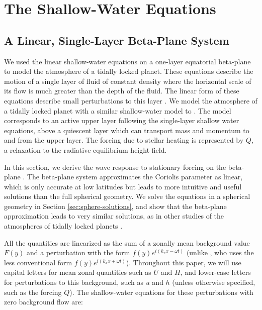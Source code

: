 \section{The Shallow-Water Equations}

\subsection*{A Linear, Single-Layer Beta-Plane System}

We used the linear shallow-water equations on a one-layer equatorial beta-plane to model the atmosphere of a tidally locked planet. These equations describe the motion of a single layer of fluid of constant density where the horizontal scale of its flow is much greater than the depth of the fluid. The linear form of these equations describe small perturbations to this layer \citep{vallis2006book}. We model the atmosphere of a tidally locked planet with a similar shallow-water model to \citet{showman2011superrotation}. The model corresponds to an active upper layer following the single-layer shallow water equations, above a quiescent layer which can transport mass and momentum to and from the upper layer. The forcing due to stellar heating is represented by $Q$, a relaxation to the radiative equilibrium height field.

In this section, we derive the wave response to stationary forcing on the beta-plane \citep{matsuno1966quasi}. The beta-plane system approximates the Coriolis parameter as linear, which is only accurate at low latitudes but leads to more intuitive and useful solutions than the full spherical geometry. We solve the equations in a spherical geometry in Section \ref{sec:sphere-solutions}, and show that the beta-plane approximation leads to very similar solutions, as in other studies of the atmospheres of tidally locked planets \citep{showman2011superrotation} \citep{heng2014analytical}.

All the quantities are linearized as the sum of a zonally mean background value $F(y)$  and a perturbation with the form  $f(y) e^{i( k_{x} x-\omega t)}$ (unlike \citet{matsuno1966quasi}, who uses the less conventional form  $f(y) e^{i( k_{x} x+\omega t)}$). Throughout this paper, we will use capital letters for mean zonal quantities such as $\bar{U}$ and $\bar{H}$, and lower-case letters for perturbations to this background, such as $u$ and $h$ (unless otherwise specified, such as the forcing $Q$). The shallow-water equations for these perturbations with zero background flow are:

